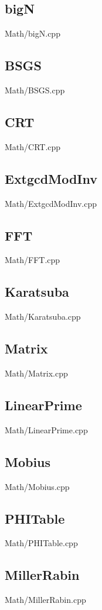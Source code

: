     \subsection{bigN}
         {Math/bigN.cpp}
    \subsection{BSGS}
         {Math/BSGS.cpp}
    \subsection{CRT}
         {Math/CRT.cpp}
    \subsection{ExtgcdModInv}
         {Math/ExtgcdModInv.cpp}
    \subsection{FFT}
         {Math/FFT.cpp}
    \subsection{Karatsuba}
         {Math/Karatsuba.cpp}
    \subsection{Matrix}
         {Math/Matrix.cpp}
    \subsection{LinearPrime}
         {Math/LinearPrime.cpp}
    \subsection{Mobius}
         {Math/Mobius.cpp}
    \subsection{PHITable}
         {Math/PHITable.cpp}
    \subsection{MillerRabin}
         {Math/MillerRabin.cpp}
